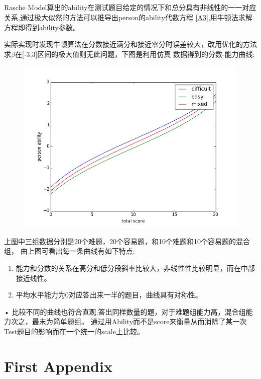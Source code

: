 \documentclass[12pt]{article}
\begin{document}
\subsection{\textbf{}}
Rasche Model算出的ability在测试题目给定的情况下和总分具有非线性的一一对应关系,通过极大似然的方法可以推导出person的ability代数方程
\ref{A3},用牛顿法求解方程即得到ability参数。

实际实现时发现牛顿算法在分数接近满分和接近零分时误差较大，改用优化的方法求$\beta$在[-3,3]区间的极大值则无此问题，下图是利用仿真
数据得到的分数-能力曲线:
\begin{figure}[!ht]
\includegraphics[width=\linewidth]{scoring.png}
\end{figure}

上图中三组数据分别是20个难题，20个容易题，和10个难题和10个容易题的混合组，
由上图可看出每一条曲线有如下特点:
\begin{enumerate}
\item{能力和分数的关系在高分和低分段斜率比较大，非线性性比较明显，而在中部接近线性。}
\item{平均水平能力为0对应答出来一半的题目，曲线具有对称性。}
\end{enumerate}•
比较不同的曲线也符合直观,答出同样数量的题，对于难题组能力高，混合组能力次之，最末为简单题组。
通过用Ability而不是score来衡量从而消除了某一次Test题目的影响而在一个统一的scale上比较。
\appendix
\section{First Appendix}\label{A1}
\end{document}
